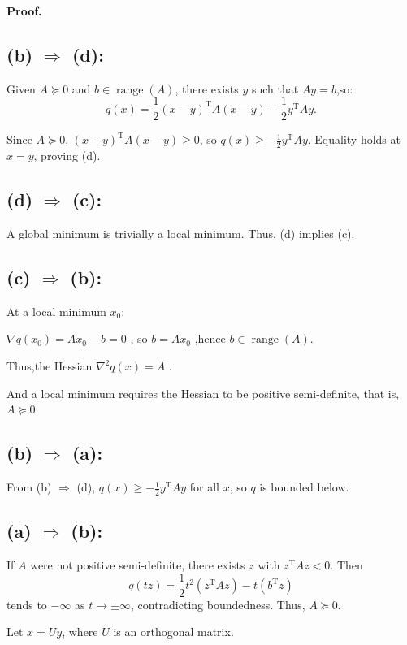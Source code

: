 \documentclass[a4paper, 11pt]{article}
\newenvironment{solution}
    {\textbf{Proof.}}
    {}
\begin{document}
\begin{solution}
	\subsection*{(b) $\Rightarrow$ (d):}
	Given \( A \succeq 0 \) and \( b \in \operatorname{range}(A) \), there exists \( y \) such that \( Ay = b \),so:
$$
	q(x) = \frac{1}{2}(x - y)^{\mathrm{T}} A (x - y) - \frac{1}{2} y^{\mathrm{T}} A y.
$$
	
	Since \( A \succeq 0 \), \( (x - y)^{\mathrm{T}} A (x - y) \geq 0 \), so \( q(x) \geq -\frac{1}{2} y^{\mathrm{T}} A y \). Equality holds at \( x = y \), proving (d).
	\subsection*{(d) $\Rightarrow$ (c): }
	
	A global minimum is trivially a local minimum. Thus, (d) implies (c).
	\subsection*{(c) $\Rightarrow$ (b): }
	
	At a local minimum \( x_0 \):
	
\( \nabla q(x_0) = Ax_0 - b = 0 \) , so \( b = Ax_0 \) ,hence \( b \in \operatorname{range}(A) \). 
	
Thus,the Hessian \( \nabla^2 q(x) = A \) .
	
And a local minimum requires the Hessian to be positive semi-definite, that is, \(A \succeq 0\).  
	\subsection*{(b) $\Rightarrow$ (a): }
	
	From (b) $\Rightarrow$ (d), \( q(x) \geq -\frac{1}{2} y^{\mathrm{T}} A y \) for all \( x \), so \( q \) is bounded below.
	\subsection*{(a) $\Rightarrow$ (b):}
	
If \( A \) were not positive semi-definite, there exists \( z \) with \( z^{\mathrm{T}}Az < 0 \). Then 
$$
q(tz) = \frac{1}{2}t^2 (z^{\mathrm{T}}Az) - t(b^{\mathrm{T}}z)
$$
tends to \( -\infty \) as \( t \to \pm\infty \), contradicting boundedness. Thus, \( A \succeq 0 \).

Let \( x = Uy \), where \( U \) is an orthogonal matrix.


\end{solution}
\end{document}
